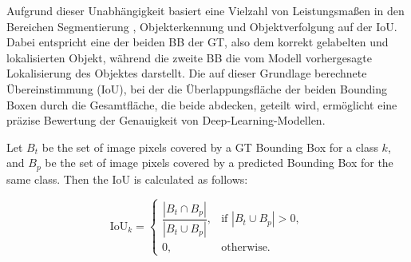 Aufgrund dieser Unabhängigkeit basiert eine Vielzahl von Leistungsmaßen in den Bereichen Segmentierung \cite{Ramirez2019,cordts2016,Zhou2017,lin2015}, Objekterkennung \cite{lin2015,Everingham2010} und Objektverfolgung \cite{Kristan2016,lealtaixé2015} auf der \acrshort{IoU}. Dabei entspricht eine der beiden \acrshort{BB} der \acrfull{GT}, also dem korrekt gelabelten und lokalisierten Objekt, während die zweite \acrshort{BB} die vom Modell vorhergesagte Lokalisierung des Objektes darstellt. Die auf dieser Grundlage berechnete Übereinstimmung (\acrshort{IoU}), bei der die Überlappungsfläche der beiden Bounding Boxen durch die Gesamtfläche, die beide abdecken, geteilt wird, ermöglicht eine präzise Bewertung der Genauigkeit von Deep-Learning-Modellen.
\begin{definition}
    Let $B_t$ be the set of image pixels covered by a \acrlong{GT} Bounding Box for a class $k$, 
    and $B_p$ be the set of image pixels covered by a predicted Bounding Box for the same class. 
    Then the IoU is calculated as follows:

    \begin{equation}
    \text{IoU}_k =
    \begin{cases}
        \dfrac{|B_t \cap B_p|}{|B_t \cup B_p|}, & \text{if } |B_t \cup B_p| > 0, \\[6pt]
        0, & \text{otherwise.}
    \end{cases}
    \end{equation}

\end{definition}







